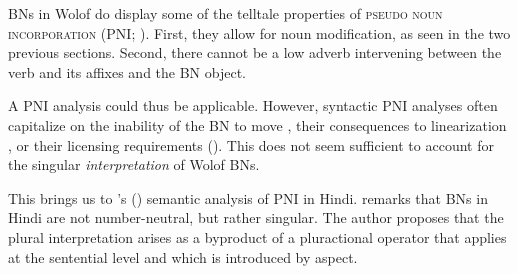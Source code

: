 \documentclass[output=paper]{langscibook}
\begin{document}
BNs in Wolof do display some of the telltale properties of \textsc{pseudo noun incorporation} (PNI; \citealt{massam2001pseudo,dayal2011hindi,baker2014pseudo}). First, they allow for noun modification, as seen in the two previous sections. Second, there cannot be a low adverb intervening between the verb and its affixes and the BN object.
		
			\ea
					\label{fon:laUdPoeMm1}
					\label{fon:laUdPoeMm2}
			\z\label{fon:laUdPoeMm}
		\z

\noindent   A PNI analysis could thus be applicable. However, syntactic PNI analyses often capitalize on the inability of the BN to move \citep{massam2001pseudo}, their consequences to linearization \citep{baker2014pseudo}, or their licensing requirements (\citealt{levin2015licensing}). This does not seem sufficient to account for the singular \textit{interpretation} of Wolof BNs.
	
This brings us to \citeauthor{dayal2011hindi}'s (\citeyear{dayal2011hindi}) semantic analysis of PNI in Hindi. \citeauthor{dayal2011hindi} remarks that BNs in Hindi are not number-neutral, but rather singular. The author proposes that the plural interpretation arises as a byproduct of a pluractional operator that applies at the sentential level and which is introduced by aspect.
		
		
			\ea
					\label{fon:dayLlasPkTt1}
						
					    \z
				
					\label{fon:dayLlasPkTt2}
			\z\label{fon:dayLlasPkTt3Ol}
		\z
		
\end{document}
